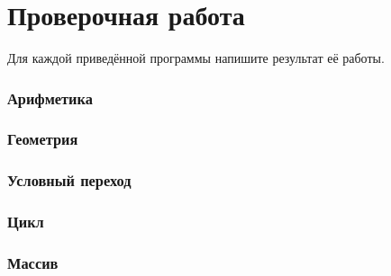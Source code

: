 \documentclass[10,a4paper]{article}
\begin{document}
\section{Проверочная работа}
Для каждой приведённой программы напишите результат её работы.
\subsubsection{Арифметика}

\subsubsection{Геометрия}

\subsubsection{Условный переход}

\subsubsection{Цикл}

\subsubsection{Массив}

\end{document}
